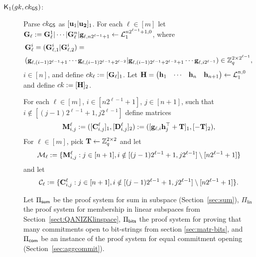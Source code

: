 \begin{description}

\item[{\(\mathsf{K}_1({gk}, ck_{\mathsf{GS}})\)}:]
Parse $ck_{\mathsf{GS}}$ as $[\mathbf{u}_1|\mathbf{u_2}]_1$.
For each \(\ell\in [m]\) let \(\mathbf{{G}}_\ell:=\mathbf{{G}}_{\ell}^{1}|\cdots|\mathbf{{G}}_{\ell}^{n}|\mathbf{g}_{\ell,{n2^{\ell-1}+1}}\gets\mathcal{L}_1^{n2^{\ell-1}+1,0}\), where
\begin{align*}
&\mathbf{{G}}_{\ell}^{i}=
(\mathbf{{G}}_{\ell,1}^{i}|\mathbf{{G}}_{\ell,2}^{i})
=\\
&(\mathbf{g}_{\ell,(i-1)2^{\ell-1}+1}\cdots\mathbf{g}_{\ell, (i-1) 2^{\ell-1}+2^{\ell-2}}|\mathbf{g}_{\ell,(i-1)2^{\ell-1}+2^{\ell-2}+1}\cdots\mathbf{g}_{\ell,i2^{\ell-1}})
\in\mathbb{Z}_q^{2\times 2^{\ell-1}},
\end{align*}
 \(i\in  [n]\), and define \(ck_\ell:=[\mathbf{{G}}_\ell]_1\).
Let \(\mathbf{{H}}=\begin{pmatrix}\mathbf{h}_1&\cdots&\mathbf{h}_n&\mathbf{h}_{n+1}\end{pmatrix}\gets\mathcal{L}_1^{n,0}\) and define \(ck:=[\mathbf{{H}}]_2\). 

For each \(\ell\in[m]\), \( i\in [n2^{\ell-1}+1]\), \(j\in  [n+1]\), such that \(i\notin [(j-1)2^{\ell-1}+1,j2^{\ell-1}]\) define matrices
\[\mathbf{{M}}^{\ell}_{i,j}:=([\mathbf{{C}}_{i,j}^{\ell}]_1,[\mathbf{{D}}_{i,j}^{\ell}]_2):=([\mathbf{g}_{\ell,i}\mathbf{h}_j^{\top}+\mathbf{{T}}]_1,[-\mathbf{{T}}]_2),\]
For \(\ell\in [m]\), pick \(\mathbf{{T}}\gets\mathbb{Z}_q^{2\times 2}\) and let
$$
\mathcal{M}_\ell:=\{\mathbf{{M}}^\ell_{i,j}:j\in[n+1],i\notin[(j-1)2^{\ell-1}+1,j2^{\ell-1}]\setminus[n2^{\ell-1}+1]\}$$
and let
$$
\mathcal{C}_\ell:=\{\mathbf{{C}}^\ell_{i,j}:j\in[n+1],i\notin[(j-1)2^{\ell-1}+1,j2^{\ell-1}]\setminus[n2^{\ell-1}+1]\}.
$$

Let \(\Pi_{\mathsf{sum}}\) be the proof system for sum in subspace 
(Section~\ref{sec:sum}), \(\Pi_\mathsf{lin}\) the proof system for membership in linear subspaces from Section~\ref{sect:QANIZKlinspace}, \(\Pi_{\mathsf{bits}}\) the proof system for proving that many commitments open to bit-strings from section \ref{sec:matr-bits}, and \(\Pi_{\mathsf{com}}\)
be an instance of the proof system for equal commitment opening (Section~\ref{sec:aggcommit}).


\end{description}
